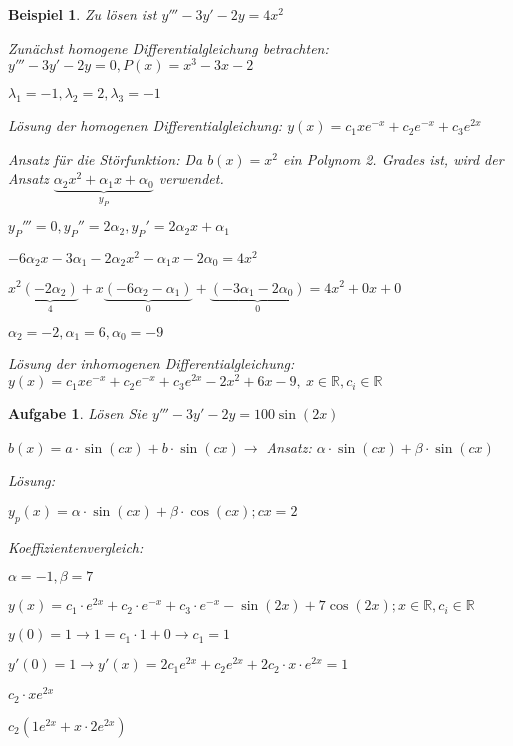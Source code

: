 \documentclass[fontset=ubuntu,12pt,a4paper]{scrreprt}
\newtheorem{beispiel}[defi]{Beispiel}
\newtheorem{aufg}[defi]{Aufgabe}
\begin{document}
     \begin{beispiel}
        Zu lösen ist \(y'''-3y'-2y=4x^2\)

        Zunächst homogene Differentialgleichung betrachten: \(y'''-3y'-2y=0,P(x)=x^3-3x-2\)

        \(\lambda_1=-1,\lambda_2=2,\lambda_3=-1\)

        Lösung der homogenen Differentialgleichung: \(y(x)=c_1xe^{-x}+c_2e^{-x}+c_3e^{2x}\)

        Ansatz für die Störfunktion: Da \(b(x)=x^2\) ein Polynom 2. Grades ist, wird der Ansatz \(\underbrace{\alpha_2x^2+\alpha_1x+\alpha_0}_{y_P}\) verwendet.

        \({y_P}'''=0,{y_P}''=2\alpha_2,{y_P}'=2\alpha_2x+\alpha_1\)

        \(-6\alpha_2x-3\alpha_1-2\alpha_2x^2-\alpha_1x-2\alpha_0=4x^2\)

        \(x^2\underbrace{(-2\alpha_2)}_4+x\underbrace{(-6\alpha_2-\alpha_1)}_0+\underbrace{(-3\alpha_1-2\alpha_0)}_0=4x^2+0x+0\)

        \(\alpha_2=-2,\alpha_1=6,\alpha_0=-9\)

        Lösung der inhomogenen Differentialgleichung: \(y(x)=c_1xe^{-x}+c_2e^{-x}+c_3e^{2x}-2x^2+6x-9,\ x\in\mathbb{R},c_i\in\mathbb{R}\)
     \end{beispiel}

     \begin{aufg}
        Lösen Sie \(y'''-3y'-2y=100\sin(2x)\)

        \(b(x)=a \cdot \sin(cx) + b \cdot \sin(cx) \to\) Ansatz: \(\alpha \cdot \sin(cx) + \beta \cdot \sin(cx)\)

        Lösung:

        \( y_p(x)=\alpha \cdot \sin(cx)+\beta \cdot \cos(cx); cx=2 \)
        
        Koeffizientenvergleich:

        \(\alpha=-1, \beta=7\)

        \(y(x)=c_1 \cdot e^{2x} + c_2 \cdot e^{-x} + c_3 \cdot e^{-x} - \sin(2x) + 7\cos(2x); x \in \mathbb{R}, c_i \in \mathbb{R} \)

        \(y(0)=1 \to 1=c_1\cdot1+0 \to c_1=1 \)

        \( y'(0)=1 \to y'(x)=2c_1e^{2x}+c_2e^{2x}+2c_2\cdot x \cdot e^{2x} = 1 \)

        \(c_2\cdot xe^{2x}\)

        \(c_2(1e^{2x}+x\cdot 2e^{2x})\)
     \end{aufg}
\end{document}
